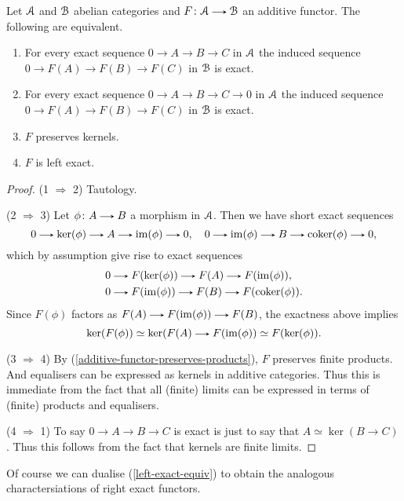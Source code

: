 \begin{lemma}
  \label{left-exact-equiv}
  Let $\mathcal{A}$ and $\mathcal{B}$ abelian categories and $F \c \A \to \B$ an additive
  functor. The following are equivalent.
  \begin{enumerate}
  \item For every exact sequence $0 \to A \to B \to C$ in $\mathcal{A}$ the
    induced sequence $0 \to F(A) \to F(B) \to F(C)$ in $\mathcal{B}$ is exact.
  \item For every exact sequence $0 \to A \to B \to C \to 0$ in $\mathcal{A}$
    the induced sequence $0 \to F(A) \to F(B) \to F(C)$ in $\mathcal{B}$ is
    exact.
  \item $F$ preserves kernels.
  \item $F$ is left exact.
  \end{enumerate}
\end{lemma}

\begin{proof}
  (1 $\Rightarrow$ 2) Tautology.

  \medskip\noindent
  (2 $\Rightarrow$ 3) Let $\phi \c A \to B$ a morphism in $\mathcal{A}$. Then we
  have short exact sequences
  \[
  0 \to \ker(\phi) \to A \to \im(\phi) \to 0, \quad 0 \to \im(\phi)
  \to B \to \coker(\phi) \to 0,
  \]
  which by assumption give rise to exact sequences
  \begin{align*}
    &0 \to F(\ker(\phi)) \to F(A) \to F(\im(\phi)), \\ &0 \to
    F(\im(\phi)) \to F(B) \to F(\coker(\phi)).
  \end{align*}
  Since $F(\phi)$ factors as $F(A) \to F(\im(\phi)) \to F(B)$, the
  exactness above implies
  \[
  \ker(F(\phi)) \simeq \ker(F(A) \to F(\im(\phi)) \simeq
  F(\ker(\phi)).
  \]

  \medskip\noindent
  (3 $\Rightarrow$ 4) By (\ref{additive-functor-preserves-products}),
  $F$ preserves finite products. And equalisers can be expressed as
  kernels in additive categories. Thus this is immediate from the fact
  that all (finite) limits can be expressed in terms of (finite)
  products and equalisers.

  \medskip\noindent
  (4 $\Rightarrow$ 1) To say $0 \to A \to B \to C$ is exact is just to
  say that $A \simeq \ker(B \to C)$. Thus this follows from the fact
  that kernels are finite limits.
\end{proof}

Of course we can dualise (\ref{left-exact-equiv}) to obtain the
analogous charactersiations of right exact functors.


\nocite{weibel, stacks}




